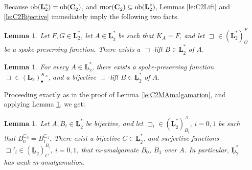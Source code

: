 \documentclass[12pt]{amsart}
\numberwithin{equation}{section}
\theoremstyle{plain}
\newtheorem{lemma}[theorem]{Lemma}
\theoremstyle{definition}
\newcommand \sqsp{\sqsupset}
\newcommand \sqsb{\sqsubset}
\newcommand \mor{{\rm{mor}}}
\newcommand \ob{{\rm{ob}}}
\newcommand \CCb{\mathbf{C}}
\newcommand \LLb{\mathbf{L}}
\newcommand \CCub{\underline{\mathbf{C}}}
\newcommand \LLub{\underline{\mathbf{L}}}
\begin{document}
Because $\ob(\LLub_2^*)=\ob(\CCub_2)$,  and $\mor(\CCub_2) \subseteq \ob(\LLub_2^*)$, Lemmas \ref{le:C2Lift} and \ref{le:C2Bijective} immediately imply the following  two facts.

\begin{lemma}
	\label{le:L2Lift}
	Let $F,G \in \LLb^*_2$,  let $A \in\LLub^*_2$ be such that $K_A=F$, and let $\sqsp \in (\LLb^*_2)^F_G$ be a spoke-preserving function. There exists a $\sqsp$-lift $B \in\LLub^*_2$ of $A$. %
\end{lemma}

\begin{lemma}
	\label{le:L2Bijective}
	For every $A \in\LLub^*_2$, there exists a spoke-preserving function $\sqsp \in (\LLb_2)^{K_A}_\bullet$, and a bijective $\sqsp$-lift $B \in\LLub^*_2$ of $A$. 
\end{lemma}

Proceeding exactly as in the proof of  Lemma \ref{le:C2MAmalgamation}, and applying Lemma \ref{le:L2Bijective},  we  get:

\begin{lemma}
	\label{le:L2MAmalgamation}
	Let  $A, {B_i} \in\LLub^*_2$ be bijective, and let $\sqsp_i \in (\LLub^*_2)^{A}_{B_i}$, $i=0,1$ be such that $B_0^{\sqsb_0}=B_1^{\sqsb_1}$. There exist a bijective  $C  \in\LLub^*_2$, and surjective functions $\sqsp'_i \in (\LLub_2)^{B_i}_{C}$, $i=0,1$, that m-amalgamate $B_0$, $B_1$ over $A$. In particular, $\LLub_2^*$ has weak m-amalgamation.
\end{lemma}

%
\end{document}

